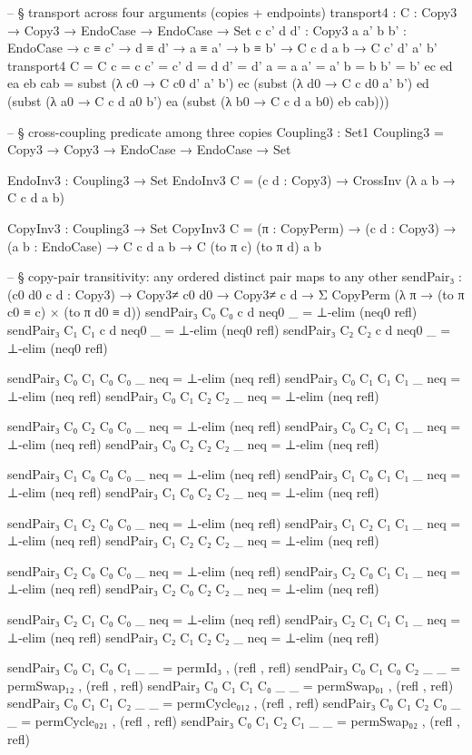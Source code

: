\documentclass[11pt,a4paper]{book}
\begin{document}
\begin{code}
-- § transport across four arguments (copies + endpoints)
transport4 : {C : Copy3 → Copy3 → EndoCase → EndoCase → Set}
  {c c' d d' : Copy3} {a a' b b' : EndoCase} →
  c ≡ c' → d ≡ d' → a ≡ a' → b ≡ b' → C c d a b → C c' d' a' b'
transport4 {C = C} {c = c} {c' = c'} {d = d} {d' = d'} {a = a} {a' = a'} {b = b} {b' = b'} ec ed ea eb cab =
  subst (λ c0 → C c0 d' a' b') ec
    (subst (λ d0 → C c d0 a' b') ed
      (subst (λ a0 → C c d a0 b') ea
        (subst (λ b0 → C c d a b0) eb cab)))

-- § cross-coupling predicate among three copies
Coupling3 : Set1
Coupling3 = Copy3 → Copy3 → EndoCase → EndoCase → Set

EndoInv3 : Coupling3 → Set
EndoInv3 C = (c d : Copy3) → CrossInv (λ a b → C c d a b)

CopyInv3 : Coupling3 → Set
CopyInv3 C = (π : CopyPerm) → (c d : Copy3) → (a b : EndoCase) → C c d a b → C (to π c) (to π d) a b

-- § copy-pair transitivity: any ordered distinct pair maps to any other
sendPair₃ : (c0 d0 c d : Copy3) → Copy3≠ c0 d0 → Copy3≠ c d →
  Σ CopyPerm (λ π → (to π c0 ≡ c) × (to π d0 ≡ d))
sendPair₃ C₀ C₀ c d neq0 _ = ⊥-elim (neq0 refl)
sendPair₃ C₁ C₁ c d neq0 _ = ⊥-elim (neq0 refl)
sendPair₃ C₂ C₂ c d neq0 _ = ⊥-elim (neq0 refl)

sendPair₃ C₀ C₁ C₀ C₀ _ neq = ⊥-elim (neq refl)
sendPair₃ C₀ C₁ C₁ C₁ _ neq = ⊥-elim (neq refl)
sendPair₃ C₀ C₁ C₂ C₂ _ neq = ⊥-elim (neq refl)

sendPair₃ C₀ C₂ C₀ C₀ _ neq = ⊥-elim (neq refl)
sendPair₃ C₀ C₂ C₁ C₁ _ neq = ⊥-elim (neq refl)
sendPair₃ C₀ C₂ C₂ C₂ _ neq = ⊥-elim (neq refl)

sendPair₃ C₁ C₀ C₀ C₀ _ neq = ⊥-elim (neq refl)
sendPair₃ C₁ C₀ C₁ C₁ _ neq = ⊥-elim (neq refl)
sendPair₃ C₁ C₀ C₂ C₂ _ neq = ⊥-elim (neq refl)

sendPair₃ C₁ C₂ C₀ C₀ _ neq = ⊥-elim (neq refl)
sendPair₃ C₁ C₂ C₁ C₁ _ neq = ⊥-elim (neq refl)
sendPair₃ C₁ C₂ C₂ C₂ _ neq = ⊥-elim (neq refl)

sendPair₃ C₂ C₀ C₀ C₀ _ neq = ⊥-elim (neq refl)
sendPair₃ C₂ C₀ C₁ C₁ _ neq = ⊥-elim (neq refl)
sendPair₃ C₂ C₀ C₂ C₂ _ neq = ⊥-elim (neq refl)

sendPair₃ C₂ C₁ C₀ C₀ _ neq = ⊥-elim (neq refl)
sendPair₃ C₂ C₁ C₁ C₁ _ neq = ⊥-elim (neq refl)
sendPair₃ C₂ C₁ C₂ C₂ _ neq = ⊥-elim (neq refl)

sendPair₃ C₀ C₁ C₀ C₁ _ _ = permId₃ , (refl , refl)
sendPair₃ C₀ C₁ C₀ C₂ _ _ = permSwap₁₂ , (refl , refl)
sendPair₃ C₀ C₁ C₁ C₀ _ _ = permSwap₀₁ , (refl , refl)
sendPair₃ C₀ C₁ C₁ C₂ _ _ = permCycle₀₁₂ , (refl , refl)
sendPair₃ C₀ C₁ C₂ C₀ _ _ = permCycle₀₂₁ , (refl , refl)
sendPair₃ C₀ C₁ C₂ C₁ _ _ = permSwap₀₂ , (refl , refl)


\end{code}
\end{document}
